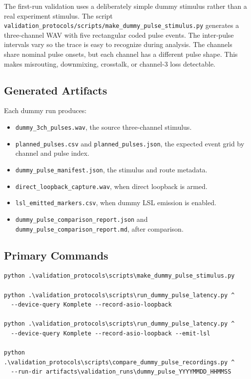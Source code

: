 \documentclass[11pt]{article}
\begin{document}
The first-run validation uses a deliberately simple dummy stimulus rather than
a real experiment stimulus. The script
\texttt{validation\_protocols/scripts/make\_dummy\_pulse\_stimulus.py}
generates a three-channel WAV with five rectangular coded pulse events. The
inter-pulse intervals vary so the trace is easy to recognize during analysis.
The channels share nominal pulse onsets, but each channel has a different pulse
shape. This makes misrouting, downmixing, crosstalk, or channel-3 loss
detectable.

\subsection{Generated Artifacts}

Each dummy run produces:

\begin{itemize}
  \item \texttt{dummy\_3ch\_pulses.wav}, the source three-channel stimulus.
  \item \texttt{planned\_pulses.csv} and \texttt{planned\_pulses.json}, the
  expected event grid by channel and pulse index.
  \item \texttt{dummy\_pulse\_manifest.json}, the stimulus and route metadata.
  \item \texttt{direct\_loopback\_capture.wav}, when direct loopback is armed.
  \item \texttt{lsl\_emitted\_markers.csv}, when dummy LSL emission is enabled.
  \item \texttt{dummy\_pulse\_comparison\_report.json} and
  \texttt{dummy\_pulse\_comparison\_report.md}, after comparison.
\end{itemize}

\subsection{Primary Commands}

\begin{verbatim}
python .\validation_protocols\scripts\make_dummy_pulse_stimulus.py

python .\validation_protocols\scripts\run_dummy_pulse_latency.py ^
  --device-query Komplete --record-asio-loopback

python .\validation_protocols\scripts\run_dummy_pulse_latency.py ^
  --device-query Komplete --record-asio-loopback --emit-lsl

python .\validation_protocols\scripts\compare_dummy_pulse_recordings.py ^
  --run-dir artifacts\validation_runs\dummy_pulse_YYYYMMDD_HHMMSS
\end{verbatim}
\end{document}

